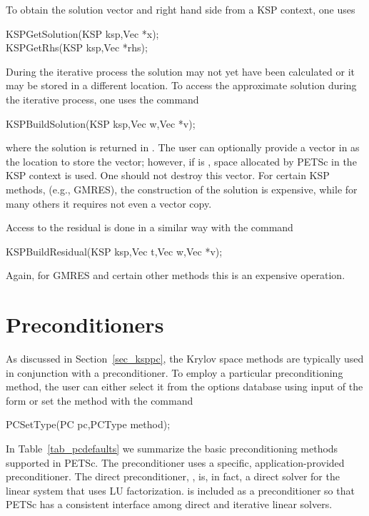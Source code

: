 To obtain the solution vector and right hand side from a KSP 
context, one uses  
\begin{tabbing}
  KSPGetSolution(KSP ksp,Vec *x);\\
  KSPGetRhs(KSP ksp,Vec *rhs);
\end{tabbing}
During the iterative process
the solution may not yet have been calculated or it may be stored in 
a different location. To access the approximate solution during the 
iterative process, one uses the command 
\begin{tabbing}
  KSPBuildSolution(KSP ksp,Vec w,Vec *v);
\end{tabbing}
where the solution is returned in . The user can optionally provide
a vector in  as the location to store the vector; however, if 
 is , space allocated by PETSc in the KSP context is 
used. One should not destroy this vector. For certain KSP methods, 
(e.g., GMRES), the construction of the solution is expensive, while for many 
others it requires not even a vector copy. 

Access to the residual is done in a similar way with the 
command 
\begin{tabbing}
  KSPBuildResidual(KSP ksp,Vec t,Vec w,Vec *v);
\end{tabbing}
Again, for GMRES and certain other methods this is an expensive 
operation.

\section{Preconditioners} 
\label{sec_pc}

As discussed in Section~\ref{sec_ksppc}, the Krylov space methods are
typically used in conjunction with a preconditioner.
To employ a particular preconditioning method, the user can either select 
it from the options database using input of the form 
 or set the method with the 
command  
\begin{tabbing}
  PCSetType(PC pc,PCType method);
\end{tabbing}
In Table~\ref{tab_pcdefaults} we summarize the basic
preconditioning methods supported in PETSc.
The  preconditioner uses a specific,
application-provided preconditioner.  The direct preconditioner, ,
is, in fact, a direct solver for the linear system that uses LU
factorization.  is included as a preconditioner so that PETSc has a
consistent interface among direct and iterative linear solvers.

